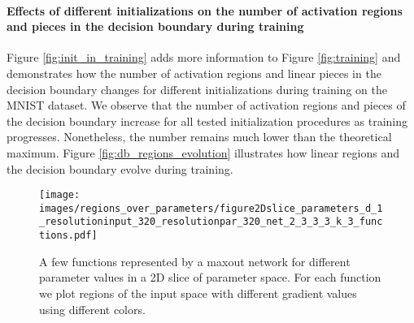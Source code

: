 \documentclass{article}
\theoremstyle{definition}
\begin{document}
\paragraph{Effects of different initializations on the number of activation regions and pieces in the decision boundary during training}
Figure \ref{fig:init_in_training} adds more information to Figure \ref{fig:training} and demonstrates how the number of activation regions and linear pieces in the decision boundary changes for different initializations during training on the MNIST dataset. 
We observe that the number of activation regions and pieces of the decision boundary increase for all tested initialization procedures as training progresses. Nonetheless, the number remains much lower than the theoretical maximum. 
Figure \ref{fig:db_regions_evolution} illustrates how linear regions and the decision boundary evolve during training. 

\begin{figure}
    \centering
    \texttt{[image: images/regions\_over\_parameters/figure2Dslice\_parameters\_d\_1\_resolutioninput\_320\_resolutionpar\_320\_net\_2\_3\_3\_3\_k\_3\_functions.pdf]}
    \caption{A few functions represented by a maxout network for different parameter values in a 2D slice of parameter space. 
    For each function we plot regions of the input space with different gradient values using different colors. 
    }
    \label{fig:1a}
\end{figure}
\end{document}
